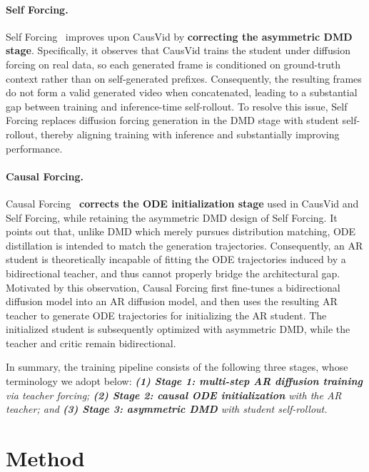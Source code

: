 \documentclass{llmxive}
\begin{document}
\paragraph{Self Forcing.}
Self Forcing~\cite{huang2025self} improves upon CausVid by \textbf{correcting the asymmetric DMD stage}. Specifically, it observes that CausVid trains the student under diffusion forcing on real data, so each generated frame is conditioned on ground-truth context rather than on self-generated prefixes. Consequently, the resulting frames do not form a valid generated video when concatenated, leading to a substantial gap between training and inference-time self-rollout. To resolve this issue, Self Forcing replaces diffusion forcing generation in the DMD stage with student self-rollout, thereby aligning training with inference and substantially improving performance.

\paragraph{Causal Forcing.}
Causal Forcing~\cite{zhu2026causal} \textbf{corrects the ODE initialization stage} used in CausVid and Self Forcing, while retaining the asymmetric DMD design of Self Forcing. It points out that, unlike DMD which merely pursues distribution matching, ODE distillation is intended to match the generation trajectories. Consequently, an AR student is theoretically incapable of fitting the ODE trajectories induced by a bidirectional teacher, and thus cannot properly bridge the architectural gap. Motivated by this observation, Causal Forcing first fine-tunes a bidirectional diffusion model into an AR diffusion model, and then uses the resulting AR teacher to generate ODE trajectories for initializing the AR student. The initialized student is subsequently optimized with asymmetric DMD, while the teacher and critic remain bidirectional. 

In summary, the training pipeline consists of the following three stages, whose terminology we adopt below: \emph{\textbf{(1) Stage 1: multi-step AR diffusion training} via teacher forcing; \textbf{(2) Stage 2: causal ODE initialization} with the AR teacher; and \textbf{(3) Stage 3: asymmetric DMD} with student self-rollout.} 

\section{Method}
\label{sec: method}
\end{document}
